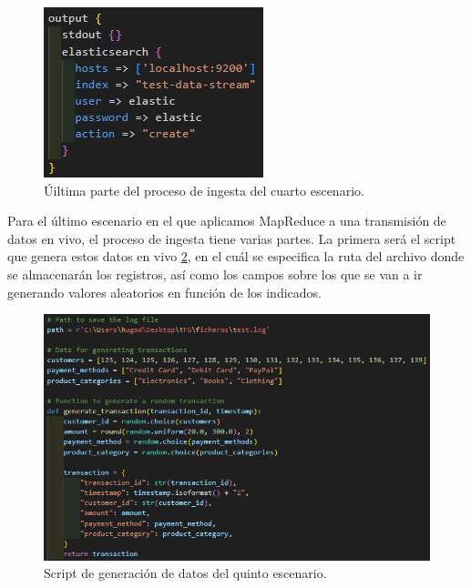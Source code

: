 \begin{figure}
    \centering
    \includegraphics[width=1\linewidth]{img/ingesta43.png}
    \caption{Úiltima parte del proceso de ingesta del cuarto escenario.}
    \label{fig:ingesta43}
\end{figure}

Para el último escenario en el que aplicamos MapReduce a una transmisión de datos en vivo, el proceso de ingesta tiene varias partes. La primera será el script que genera estos datos en vivo \ref{fig:ingesta51}, en el cuál se especifica la ruta del archivo donde se almacenarán los registros, así como los campos sobre los que se van a ir generando valores aleatorios en función de los indicados. 

\begin{figure}
    \centering
    \includegraphics[width=1\linewidth]{img/ingesta51.png}
    \caption{Script de generación de datos del quinto escenario.}
    \label{fig:ingesta51}
\end{figure}

